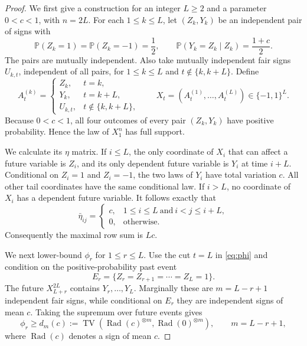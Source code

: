 \documentclass[11pt]{article}
\newcommand{\Pp}{\mathbb P}
\newcommand{\TV}{\operatorname{TV}}
\begin{document}
\begin{proof}
We first give a construction for an integer $L\geq2$ and a parameter
$0<c<1$, with $n=2L$.  For each $1\leq k\leq L$, let $(Z_k,Y_k)$ be an
independent pair of signs with
\[
 \Pp(Z_k=1)=\Pp(Z_k=-1)=\frac12,
 \qquad
 \Pp(Y_k=Z_k\mid Z_k)=\frac{1+c}{2}.
\]
The pairs are mutually independent.  Also take mutually independent fair
signs $U_{k,t}$, independent of all pairs, for
$1\leq k\leq L$ and $t\notin\{k,k+L\}$.  Define
\[
 A_t^{(k)}=
 \begin{cases}
  Z_k,&t=k,\\
  Y_k,&t=k+L,\\
  U_{k,t},&t\notin\{k,k+L\},
 \end{cases}
 \qquad
 X_t=(A_t^{(1)},\ldots,A_t^{(L)})\in\{-1,1\}^L.
\]
Because $0<c<1$, all four outcomes of every pair $(Z_k,Y_k)$ have positive
probability.  Hence the law of $X_1^n$ has full support.

We calculate its $\eta$ matrix.  If $i\leq L$, the only coordinate of $X_i$
that can affect a future variable is $Z_i$, and its only dependent future
variable is $Y_i$ at time $i+L$.  Conditional on $Z_i=1$ and $Z_i=-1$, the
two laws of $Y_i$ have total variation $c$.  All other tail coordinates have
the same conditional law.  If $i>L$, no coordinate of $X_i$ has a dependent
future variable.  It follows exactly that
\begin{equation}\label{eq:eta-matrix}
 \bar\eta_{ij}=
 \begin{cases}
  c,&1\leq i\leq L\ \text{and}\ i<j\leq i+L,\\
  0,&\text{otherwise}.
 \end{cases}
\end{equation}
Consequently the maximal row sum is $Lc$.

We next lower-bound $\phi_r$ for $1\leq r\leq L$.  Use the cut $t=L$ in
\eqref{eq:phi} and condition on the positive-probability past event
\[
 E_r=\{Z_r=Z_{r+1}=\cdots=Z_L=1\}.
\]
The future $X_{L+r}^{2L}$ contains $Y_r,\ldots,Y_L$.  Marginally these are
$m=L-r+1$ independent fair signs, while conditional on $E_r$ they are
independent signs of mean $c$.  Taking the supremum over future events gives
\begin{equation}\label{eq:phi-lower}
 \phi_r\geq d_m(c):=
 \TV\!\left(\operatorname{Rad}(c)^{\otimes m},
             \operatorname{Rad}(0)^{\otimes m}\right),
 \qquad m=L-r+1,
\end{equation}
where $\operatorname{Rad}(c)$ denotes a sign of mean $c$.


\end{proof}
\end{document}
